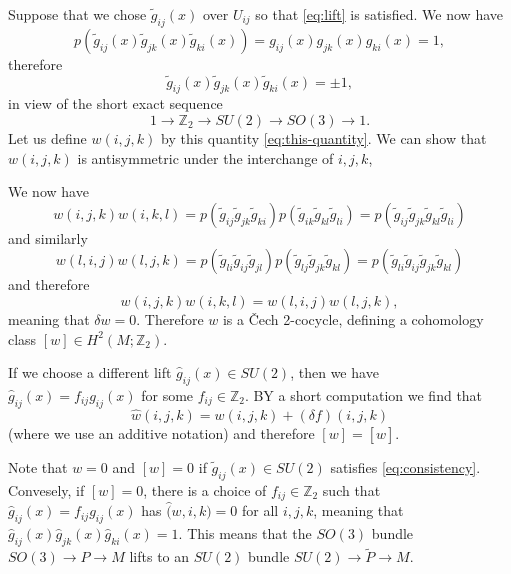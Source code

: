 \documentclass[12pt]{article}
\numberwithin{equation}{section}
\numberwithin{figure}{section}
\theoremstyle{remark}
\def\bZ{\mathbb{Z}}
\begin{document}
Suppose that we chose $\tilde g_{ij}(x)$ over $U_{ij}$ so that \eqref{eq:lift} is satisfied.
We now have \begin{equation}
p(\tilde g_{ij}(x)\tilde g_{jk}(x)\tilde g_{ki}(x)) = g_{ij}(x)g_{jk}(x)g_{ki}(x)=1,
\end{equation}
therefore \begin{equation}
\tilde g_{ij}(x)\tilde g_{jk}(x)\tilde g_{ki}(x) = \pm 1, \label{eq:this-quantity}
\end{equation} in view of the short exact sequence \begin{equation}
1\to \bZ_2 \to SU(2)\to SO(3)\to 1.
\end{equation}
Let us define $w(i,j,k)$ by this quantity \eqref{eq:this-quantity}.
We can show that $w(i,j,k)$ is antisymmetric under the interchange of $i,j,k$,

We now have \begin{equation}
w(i,j,k)w(i,k,l)= p(\tilde g_{ij} \tilde g_{jk}\tilde g_{ki} ) 
p(\tilde g_{ik} \tilde g_{kl} \tilde g_{li})
=p(\tilde g_{ij} \tilde g_{jk}\tilde g_{kl} \tilde g_{li})
\end{equation} and similarly \begin{equation}
  w(l,i,j)w(l,j,k)= p(\tilde g_{li} \tilde g_{ij}\tilde g_{jl} ) 
  p(\tilde g_{lj} \tilde g_{jk} \tilde g_{kl})
  =p(\tilde g_{li}\tilde g_{ij} \tilde g_{jk}\tilde g_{kl} )  
\end{equation} and therefore \begin{equation}
  w(i,j,k)w(i,k,l) = w(l,i,j)w(l,j,k),
\end{equation}  meaning that $\delta w=0$.
Therefore $w$ is a \v Cech 2-cocycle, defining a cohomology class $[w]\in H^2(M;\bZ_2)$.


If we choose a different lift $\hat g_{ij}(x)\in SU(2)$, then we have 
$\hat g_{ij}(x)= f_{ij} g_{ij}(x)$ for some $f_{ij}\in \bZ_2$.
BY a short computation we find that 
\begin{equation}
\hat w(i,j,k) = w(i,j,k) + (\delta f)(i,j,k)
\end{equation} (where we use an additive notation) and therefore $[w]=[\hat w]$.

Note that $w=0$ and $[w]=0$ if $\tilde g_{ij}(x)\in SU(2)$ satisfies \eqref{eq:consistency}.
Convesely, if $[w]=0$, there is a choice of $f_{ij}\in \bZ_2$ such that $\hat g_{ij}(x)= f_{ij} g_{ij}(x)$ has $\hat (w,i,k)=0$ for all $i,j,k$,
meaning that $\hat g_{ij}(x) \hat g_{jk}(x)\hat g_{ki}(x)=1$.
This means that the $SO(3)$ bundle $SO(3)\to P\to M$ lifts to an $SU(2)$ bundle $SU(2)\to \tilde P\to M$.
\end{document}
